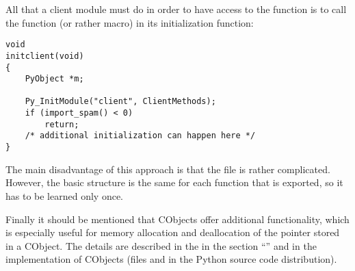 All that a client module must do in order to have access to the
function  is to call the function (or
rather macro)  in its initialization
function:

\begin{verbatim}
void
initclient(void)
{
    PyObject *m;

    Py_InitModule("client", ClientMethods);
    if (import_spam() < 0)
        return;
    /* additional initialization can happen here */
}
\end{verbatim}

The main disadvantage of this approach is that the file
 is rather complicated. However, the
basic structure is the same for each function that is
exported, so it has to be learned only once.

Finally it should be mentioned that CObjects offer additional
functionality, which is especially useful for memory allocation and
deallocation of the pointer stored in a CObject. The details
are described in the  in the section
``'' and in the implementation
of CObjects (files  and
 in the Python source code distribution).
